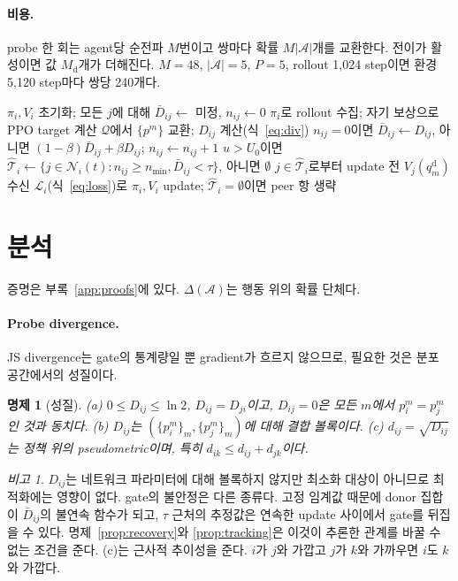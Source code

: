 \documentclass[twocolumn,10pt]{article}
\newtheorem{proposition}{명제}
\theoremstyle{remark}
\newtheorem{remark}{비고}
\newcommand{\ours}{PGCT}
\begin{document}
\paragraph{비용.} probe 한 회는 agent당 순전파 $M$번이고 쌍마다 확률 $M|\mathcal{A}|$개를 교환한다. 전이가 활성이면 값
$M_{\mathrm{d}}$개가 더해진다. $M=48$, $|\mathcal{A}|=5$, $P=5$, rollout 1{,}024 step이면 환경 5{,}120 step마다 쌍당 240개다.

\begin{algorithm}[t]
\caption{agent $i$의 \ours{}}
\label{alg:pgct}
\begin{algorithmic}[1]
\State $\pi_i,V_i$ 초기화; 모든 $j$에 대해 $\bar D_{ij}\gets$ 미정, $n_{ij}\gets 0$
  \State $\pi_i$로 rollout 수집; 자기 보상으로 PPO target 계산
      \State $\mathcal{Q}$에서 $\{p^m\}$ 교환; $D_{ij}$ 계산(식~\ref{eq:div})
      \State $n_{ij}=0$이면 $\bar D_{ij}\gets D_{ij}$, 아니면 $(1-\beta)\bar D_{ij}+\beta D_{ij}$; $n_{ij}\gets n_{ij}+1$
    \EndFor
  \EndIf
  \State $u>U_0$이면 $\hat{\mathcal{T}}_i\gets\{j\in\mathcal{N}_i(t):n_{ij}\ge n_{\min},\bar D_{ij}<\tau\}$, 아니면 $\emptyset$
  \State $j\in\hat{\mathcal{T}}_i$로부터 update 전 $V_j(q^{\mathrm{d}}_m)$ 수신
  \State $\mathcal{L}_i$(식~\ref{eq:loss})로 $\pi_i,V_i$ update; $\hat{\mathcal{T}}_i=\emptyset$이면 peer 항 생략
\EndFor
\end{algorithmic}
\end{algorithm}

\section{분석}
\label{sec:analysis}
증명은 부록~\ref{app:proofs}에 있다. $\Delta(\mathcal{A})$는 행동 위의 확률 단체다.

\paragraph{Probe divergence.} JS divergence는 gate의 통계량일 뿐 gradient가 흐르지 않으므로, 필요한 것은 분포 공간에서의
성질이다.
\begin{proposition}[성질]
\label{prop:properties}
(a) $0\le D_{ij}\le\ln 2$, $D_{ij}=D_{ji}$이고, $D_{ij}=0$은 모든 $m$에서 $p_i^m=p_j^m$인 것과 동치다.
(b) $D_{ij}$는 $(\{p_i^m\}_m,\{p_j^m\}_m)$에 대해 결합 볼록이다.
(c) $d_{ij}=\sqrt{D_{ij}}$는 정책 위의 pseudometric이며, 특히 $d_{ik}\le d_{ij}+d_{jk}$이다.
\end{proposition}
\begin{remark}
$D_{ij}$는 네트워크 파라미터에 대해 볼록하지 않지만 최소화 대상이 아니므로 최적화에는 영향이 없다. gate의 불안정은 다른
종류다. 고정 임계값 때문에 donor 집합이 $\bar D_{ij}$의 불연속 함수가 되고, $\tau$ 근처의 추정값은 연속한 update 사이에서
gate를 뒤집을 수 있다. 명제~\ref{prop:recovery}와 \ref{prop:tracking}은 이것이 추론한 관계를 바꿀 수 없는 조건을 준다. (c)는
근사적 추이성을 준다. $i$가 $j$와 가깝고 $j$가 $k$와 가까우면 $i$도 $k$와 가깝다.
\end{remark}
\end{document}
